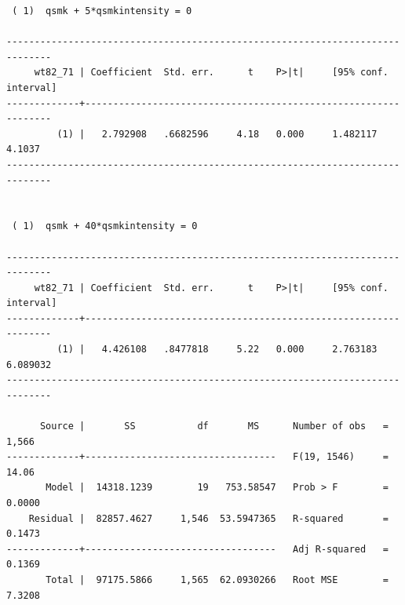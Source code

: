 \documentclass[
  10pt,
]{book}
\begin{document}
\begin{verbatim}
 ( 1)  qsmk + 5*qsmkintensity = 0

------------------------------------------------------------------------------
     wt82_71 | Coefficient  Std. err.      t    P>|t|     [95% conf. interval]
-------------+----------------------------------------------------------------
         (1) |   2.792908   .6682596     4.18   0.000     1.482117      4.1037
------------------------------------------------------------------------------


 ( 1)  qsmk + 40*qsmkintensity = 0

------------------------------------------------------------------------------
     wt82_71 | Coefficient  Std. err.      t    P>|t|     [95% conf. interval]
-------------+----------------------------------------------------------------
         (1) |   4.426108   .8477818     5.22   0.000     2.763183    6.089032
------------------------------------------------------------------------------

      Source |       SS           df       MS      Number of obs   =     1,566
-------------+----------------------------------   F(19, 1546)     =     14.06
       Model |  14318.1239        19   753.58547   Prob > F        =    0.0000
    Residual |  82857.4627     1,546  53.5947365   R-squared       =    0.1473
-------------+----------------------------------   Adj R-squared   =    0.1369
       Total |  97175.5866     1,565  62.0930266   Root MSE        =    7.3208


\end{verbatim}
\end{document}
